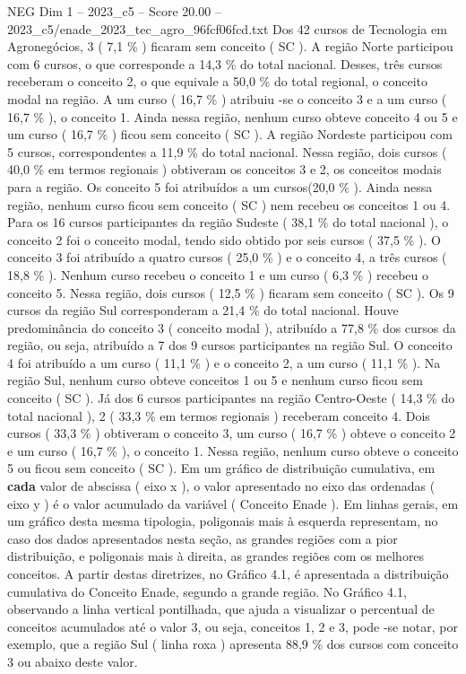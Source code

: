 \begin{textsample}{NEG Dim 1 – 2023\_c5 – Score 20.00 – 2023\_c5/enade\_2023\_tec\_agro\_96fcf06fcd.txt}
Dos 42 cursos de Tecnologia em Agronegócios, 3 ( 7,1 \% ) ficaram sem conceito ( SC ).
A região Norte participou com 6 cursos, o que corresponde a 14,3 \% do total nacional.
Desses, três cursos receberam o conceito 2, o que equivale a 50,0 \% do total regional, o conceito modal na região.
A um curso ( 16,7 \% ) atribuiu -se o conceito 3 e a um curso ( 16,7 \% ), o conceito 1.
Ainda nessa região, nenhum curso obteve conceito 4 ou 5 e um curso ( 16,7 \% ) ficou sem conceito ( SC ).
A região Nordeste participou com 5 cursos, correspondentes a 11,9 \% do total nacional.
Nessa região, dois cursos ( 40,0 \% em termos regionais ) obtiveram os conceitos 3 e 2, os conceitos modais para a região.
Os conceito 5 foi atribuídos a um cursos(20,0 \% ).
Ainda nessa região, nenhum curso ficou sem conceito ( SC ) nem recebeu os conceitos 1 ou 4.
Para os 16 cursos participantes da região Sudeste ( 38,1 \% do total nacional ), o conceito 2 foi o conceito modal, tendo sido obtido por seis cursos ( 37,5 \% ).
O conceito 3 foi atribuído a quatro cursos ( 25,0 \% ) e o conceito 4, a três cursos ( 18,8 \% ).
Nenhum curso recebeu o conceito 1 e um curso ( 6,3 \% ) recebeu o conceito 5.
Nessa região, dois cursos ( 12,5 \% ) ficaram sem conceito ( SC ).
Os 9 cursos da região Sul corresponderam a 21,4 \% do total nacional.
Houve predominância do conceito 3 ( conceito modal ), atribuído a 77,8 \% dos cursos da região, ou seja, atribuído a 7 dos 9 cursos participantes na região Sul.
O conceito 4 foi atribuído a um curso ( 11,1 \% ) e o conceito 2, a um curso ( 11,1 \% ).
Na região Sul, nenhum curso obteve conceitos 1 ou 5 e nenhum curso ficou sem conceito ( SC ).
Já dos 6 cursos participantes na região Centro-Oeste ( 14,3 \% do total nacional ), 2 ( 33,3 \% em termos regionais ) receberam conceito 4.
Dois cursos ( 33,3 \% ) obtiveram o conceito 3, um curso ( 16,7 \% ) obteve o conceito 2 e um curso ( 16,7 \% ), o conceito 1.
Nessa região, nenhum curso obteve o conceito 5 ou ficou sem conceito ( SC ).
Em um gráfico de distribuição cumulativa, em \textbf{cada} valor de abscissa ( eixo x ), o valor apresentado no eixo das ordenadas ( eixo y ) é o valor acumulado da variável ( Conceito Enade ).
Em linhas gerais, em um gráfico desta mesma tipologia, poligonais mais à esquerda representam, no caso dos dados apresentados nesta seção, as grandes regiões com a pior distribuição, e poligonais mais à direita, as grandes regiões com os melhores conceitos.
A partir destas diretrizes, no Gráfico 4.1, é apresentada a distribuição cumulativa do Conceito Enade, segundo a grande região.
No Gráfico 4.1, observando a linha vertical pontilhada, que ajuda a visualizar o percentual de conceitos acumulados até o valor 3, ou seja, conceitos 1, 2 e 3, pode -se notar, por exemplo, que a região Sul ( linha roxa ) apresenta 88,9 \% dos cursos com conceito 3 ou abaixo deste valor.

\end{textsample}
